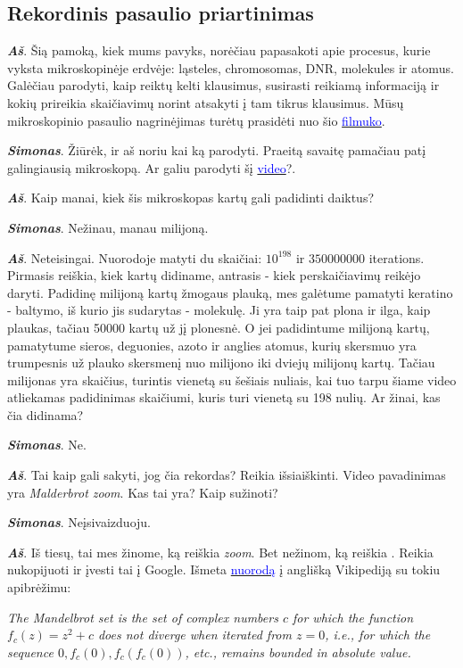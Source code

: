 \documentclass[a4paper]{article}
\newcommand{\goto}[2]{\href{\detokenize{#1}}{\textcolor{blue}{#2}}}
\newcommand{\say}[1]{\textbf{\textit{#1}}}
\begin{document}
\subsection*{Rekordinis pasaulio priartinimas}
\say{Aš}. Šią pamoką, kiek mums pavyks, norėčiau papasakoti apie procesus, kurie vyksta mikroskopinėje erdvėje: ląsteles, chromosomas, DNR, molekules ir atomus. Galėčiau parodyti, kaip reiktų kelti klausimus, susirasti reikiamą informaciją ir kokių prireikia skaičiavimų norint atsakyti į tam tikrus klausimus. Mūsų mikroskopinio pasaulio nagrinėjimas turėtų prasidėti nuo šio \goto{https://www.youtube.com/watch?v=7WhRJV_bAiE}{filmuko}.

\say{Simonas}. Žiūrėk, ir aš noriu kai ką parodyti. Praeitą savaitę pamačiau patį galingiausią mikroskopą. Ar galiu parodyti šį \href{https://www.youtube.com/watch?v=zXTpASSd9xE\&t=101s}{\textcolor{blue}{video}}?. 

\say{Aš}. Kaip manai, kiek šis mikroskopas kartų gali padidinti daiktus?

\say{Simonas}. Nežinau, manau milijoną.

\say{Aš}. Neteisingai. Nuorodoje matyti du skaičiai: $10^{198}$ ir $350000000$ iterations. Pirmasis reiškia, kiek kartų didiname, antrasis - kiek perskaičiavimų reikėjo daryti. Padidinę milijoną kartų žmogaus plauką, mes galėtume pamatyti keratino - baltymo, iš kurio jis sudarytas - molekulę. Ji yra taip pat plona ir ilga, kaip plaukas, tačiau 50000 kartų už jį plonesnė. O jei padidintume milijoną kartų, pamatytume sieros, deguonies, azoto ir anglies atomus, kurių skersmuo yra trumpesnis už plauko skersmenį nuo milijono iki dviejų milijonų kartų. Tačiau milijonas yra skaičius, turintis vienetą su šešiais nuliais, kai tuo tarpu šiame video atliekamas padidinimas skaičiumi, kuris turi vienetą su 198 nulių. Ar žinai, kas čia didinama?

\say{Simonas}. Ne.

\say{Aš}. Tai kaip gali sakyti, jog čia rekordas? Reikia išsiaiškinti. Video pavadinimas yra \textit{Malderbrot zoom}. Kas tai yra? Kaip sužinoti?

\say{Simonas}. Neįsivaizduoju.

\say{Aš}. Iš tiesų, tai mes žinome, ką reiškia \textit{zoom}. Bet nežinom, ką reiškia . Reikia nukopijuoti ir įvesti tai į Google. Išmeta \goto{https://en.wikipedia.org/wiki/Mandelbrot_set}{nuorodą} į anglišką Vikipediją su tokiu apibrėžimu:

\begin{center}
\textit{The Mandelbrot set is the set of complex numbers $\displaystyle c$ for which the function $\displaystyle f_{c}(z)=z^{2}+c$  does not diverge when iterated from $z=0$, i.e., for which the sequence $0,f_{c}(0), f_{c}(f_{c}(0))$, etc., remains bounded in absolute value.}
\end{center}
\end{document}
